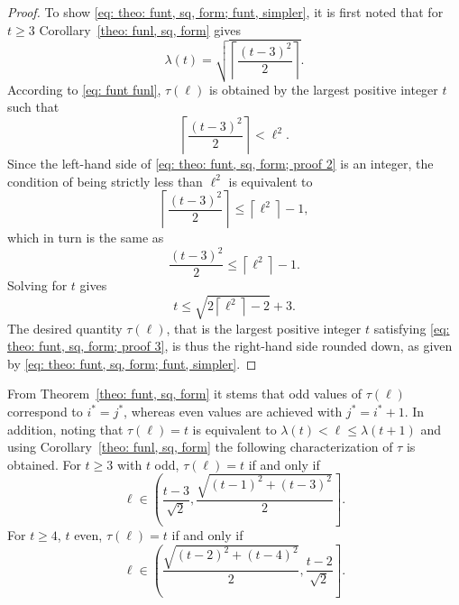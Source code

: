 \documentclass[12pt, a4paper]{article}
\newcommand{\funt}{\tau} %
\newcommand{\funl}{\lambda} %
\newcommand{\len}{\ell} %
\newcommand{\tiles}{t} %
\newcommand{\isoli}{i^\ast}
\newcommand{\jsoli}{j^\ast}
\begin{document}
\begin{proof}
To show \eqref{eq: theo: funt, sq, form; funt, simpler}, it is first noted that for $\tiles \geq 3$ Corollary~\ref{theo: funl, sq, form} gives
\begin{equation}
\funl(\tiles) = \sqrt{\left\lceil \frac{(\tiles-3)^2} {2} \right\rceil}.
\end{equation}
According to \eqref{eq: funt funl}, $\funt(\len)$ is obtained by the largest positive integer $t$ such that 
\begin{equation}
\label{eq: theo: funt, sq, form; proof 2}
\left\lceil \frac{(\tiles-3)^2} {2} \right\rceil < \len ^ 2.
\end{equation}
Since the left-hand side of \eqref{eq: theo: funt, sq, form; proof 2} is an integer, the condition of being strictly less than $\len^2$ is equivalent to
\begin{equation}
\left\lceil \frac{(\tiles-3)^2} {2} \right\rceil  \leq \left\lceil \len^2 \right\rceil  - 1,
\end{equation}
which in turn is the same as
\begin{equation}
\frac{(\tiles-3)^2} {2}\leq  \left\lceil \len^2 \right\rceil  - 1. 
\end{equation}
Solving for $\tiles$ gives
\begin{equation}
\label{eq: theo: funt, sq, form; proof 3}
\tiles \leq \sqrt{2 \left\lceil \len^2 \right\rceil -2 } + 3.
\end{equation}
The desired quantity $\funt(\len)$, that is the largest positive integer $\tiles$ satisfying \eqref{eq: theo: funt, sq, form; proof 3}, is thus the right-hand side rounded down, as given by \eqref{eq: theo: funt, sq, form; funt, simpler}.
\end{proof}

From Theorem~\ref{theo: funt, sq, form} it stems that odd values of $\funt(\len)$ correspond to $\isoli = \jsoli$, whereas even values are achieved with $\jsoli = \isoli+1$. In addition, noting that $\funt(\len) = \tiles$ is equivalent to $\funl(\tiles) < \len \leq \funl(\tiles+1)$ and using Corollary~\ref{theo: funl, sq, form} the following characterization of $\funt$ is obtained. For $\tiles \geq 3$ with $\tiles$ odd, $\funt(\len) = \tiles$ if and only if
\begin{equation}
\label{eq: square, odd max tiles, lengths}
\len \in \left( \frac{\tiles-3}{\sqrt{2}}, \frac{ \sqrt{(\tiles-1)^2+(\tiles-3)^2}}{2} \right].
\end{equation}
For $\tiles \geq 4$, $\tiles$ even, $\funt(\len) = \tiles$ if and only if
\begin{equation}
\label{eq: square, even max tiles, lengths}
\len \in \left(\frac{ \sqrt{(\tiles-2)^2+(\tiles-4)^2}}{2}, \frac{\tiles-2}{\sqrt{2}} \right].
\end{equation}
\end{document}

